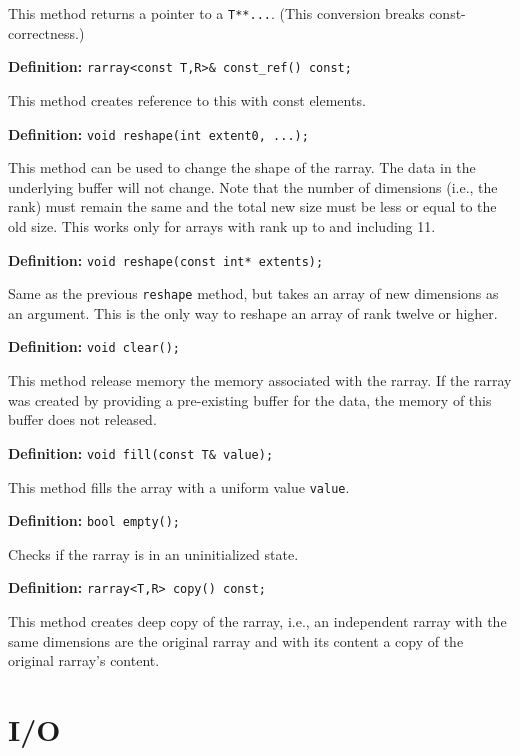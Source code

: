 \documentclass[11pt,twoside]{article}
\begin{document}
This method returns a pointer to a \texttt{T**...}. (This conversion breaks const-correctness.)


\noindent\textbf{Definition:} \texttt{rarray{\tt<}const T,R{\tt>}\& const\_ref() const;}

This method creates reference to this with const elements.

\noindent\textbf{Definition:} \texttt{void reshape(int extent0, ...);}

This method can be used to change the shape of the rarray. The data in
the underlying buffer will not change. Note that the number of
dimensions (i.e., the rank) must remain the same and the total new size must be less or equal to the old size.  This works only for arrays with rank up to and including 11. 

\noindent\textbf{Definition:} \texttt{void reshape(const int* extents);}

Same as the previous \texttt{reshape} method, but takes an array of new dimensions as an argument.  This is the only way to reshape an array of rank twelve or higher.

\noindent\textbf{Definition:} \texttt{void clear();}

This method release memory the memory associated with the rarray. If the rarray was created by providing a pre-existing buffer for the data, the memory of this buffer does not released.

\noindent\textbf{Definition:} \texttt{void fill(const T\& value);}

This method fills the array with a uniform value \texttt{value}.

\noindent\textbf{Definition:} \texttt{bool empty();}

Checks if the rarray is in an uninitialized state.

\noindent\textbf{Definition:} \texttt{rarray{\tt<}T,R{\tt>} copy() const;}

This method creates deep copy of the rarray, i.e., an independent rarray with the same dimensions are the original rarray and with its content a copy of the original rarray's content.

\section{I/O}
\end{document}
